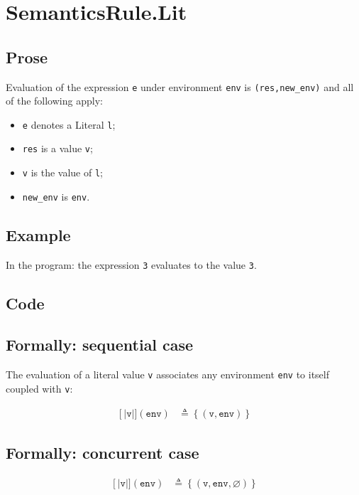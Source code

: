 \documentclass{book}
\newcommand\llbracket{[|}
\newcommand\rrbracket{|]}
\newcommand\interp[1]{\left\llbracket #1 \right\rrbracket}
\begin{document}
\section{SemanticsRule.Lit \label{sec:SemanticsRule.Lit}}

  \subsection{Prose}
  Evaluation of the expression \texttt{e} under environment \texttt{env} is
  \texttt{(res,new\_env)} and all of the following apply:
  \begin{itemize}
  \item \texttt{e} denotes a Literal \texttt{l};
  \item \texttt{res} is a value \texttt{v};
  \item \texttt{v} is the value of \texttt{l};
  \item \texttt{new\_env} is \texttt{env}.
  \end{itemize}

  \subsection{Example}
  In the program:
  the expression \texttt{3} evaluates to the value \texttt{3}.

  \subsection{Code}

  \subsection{Formally: sequential case}
  The evaluation of a literal value \texttt{v} associates any environment
\texttt{env} to itself coupled with \texttt{v}: 

  \begin{align}
  \interp{\texttt{v}}(\texttt{env}) & \triangleq \left\{ (\texttt{v}, \texttt{env}) \right\}
  \label{eq:sem-seq-lit}
  \end{align}

  \subsection{Formally: concurrent case}
  \begin{align}
  \interp{\texttt{v}}(\texttt{env}) & \triangleq \left\{ (\texttt{v}, \texttt{env}, \varnothing) \right\}
  \label{eq:sem-conc-lit}
  \end{align}
\end{document}
